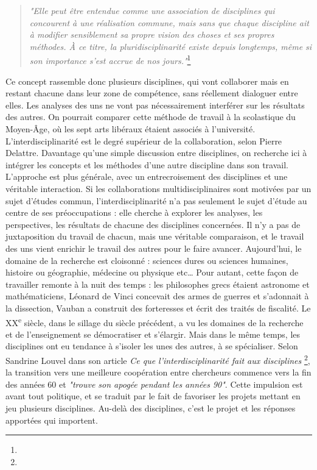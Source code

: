 \begin{quote} 
    \textit{"Elle peut être entendue comme une association de disciplines qui concourent à une réalisation commune, mais sans que chaque discipline ait à modifier sensiblement sa propre vision des choses et ses propres méthodes. À ce titre, la pluridisciplinarité existe depuis longtemps, même si son importance s'est accrue de nos jours."}\footnote{}
\end{quote}
Ce concept rassemble donc plusieurs disciplines, qui vont collaborer mais en restant chacune dans leur zone de compétence, sans réellement dialoguer entre elles. Les analyses des uns ne vont pas nécessairement interférer sur les résultats des autres. On pourrait comparer cette méthode de travail à la scolastique du Moyen-Âge, où les sept arts libéraux étaient associés à l’université.\\ 
L’interdisciplinarité est le degré supérieur de la collaboration, selon Pierre Delattre. Davantage qu’une simple discussion entre disciplines, on recherche ici à intégrer les concepts et les méthodes d’une autre discipline dans son travail. L’approche est plus générale, avec un entrecroisement des disciplines et une véritable interaction. Si les collaborations multidisciplinaires sont motivées par un sujet d’études commun, l’interdisciplinarité n’a pas seulement le sujet d’étude au centre de ses préoccupations : elle cherche à explorer les analyses, les perspectives, les résultats de chacune des disciplines concernées. Il n’y a pas de juxtaposition du travail de chacun, mais une véritable comparaison, et le travail des uns vient enrichir le travail des autres pour le faire avancer. Aujourd’hui, le domaine de la recherche est cloisonné : sciences dures ou sciences humaines, histoire ou géographie, médecine ou physique etc…  Pour autant, cette façon de travailler remonte à la nuit des temps : les philosophes grecs étaient astronome et mathématiciens, Léonard de Vinci concevait des armes de guerres et s’adonnait à la dissection, Vauban a construit des forteresses et écrit des traités de fiscalité. Le XX\textsuperscript{e} siècle, dans le sillage du siècle précédent, a vu les domaines de la recherche et de l’enseignement se démocratiser et s’élargir. Mais dans le même temps, les disciplines ont eu tendance à s’isoler les unes des autres, à se spécialiser. Selon Sandrine Louvel dans son article \textit{Ce que l’interdisciplinarité fait aux disciplines} \footnote{}, la transition vers une meilleure coopération entre chercheurs commence vers la fin des années 60 et \textit{"trouve son apogée pendant les années 90"}. Cette impulsion est avant tout politique, et se traduit par le fait de favoriser les projets mettant en jeu plusieurs disciplines. Au-delà des disciplines, c’est le projet et les réponses apportées qui importent.\\ 
